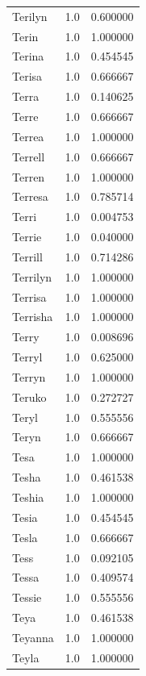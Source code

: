 \documentclass[
  letterpaper,
  DIV=11,
  numbers=noendperiod]{scrreprt}
\begin{document}
\begin{tabular}{lrr}
Terilyn         &   1.0 &   0.600000 \\
Terin           &   1.0 &   1.000000 \\
Terina          &   1.0 &   0.454545 \\
Terisa          &   1.0 &   0.666667 \\
Terra           &   1.0 &   0.140625 \\
Terre           &   1.0 &   0.666667 \\
Terrea          &   1.0 &   1.000000 \\
Terrell         &   1.0 &   0.666667 \\
Terren          &   1.0 &   1.000000 \\
Terresa         &   1.0 &   0.785714 \\
Terri           &   1.0 &   0.004753 \\
Terrie          &   1.0 &   0.040000 \\
Terrill         &   1.0 &   0.714286 \\
Terrilyn        &   1.0 &   1.000000 \\
Terrisa         &   1.0 &   1.000000 \\
Terrisha        &   1.0 &   1.000000 \\
Terry           &   1.0 &   0.008696 \\
Terryl          &   1.0 &   0.625000 \\
Terryn          &   1.0 &   1.000000 \\
Teruko          &   1.0 &   0.272727 \\
Teryl           &   1.0 &   0.555556 \\
Teryn           &   1.0 &   0.666667 \\
Tesa            &   1.0 &   1.000000 \\
Tesha           &   1.0 &   0.461538 \\
Teshia          &   1.0 &   1.000000 \\
Tesia           &   1.0 &   0.454545 \\
Tesla           &   1.0 &   0.666667 \\
Tess            &   1.0 &   0.092105 \\
Tessa           &   1.0 &   0.409574 \\
Tessie          &   1.0 &   0.555556 \\
Teya            &   1.0 &   0.461538 \\
Teyanna         &   1.0 &   1.000000 \\
Teyla           &   1.0 &   1.000000 \\

\end{tabular}
\end{document}
